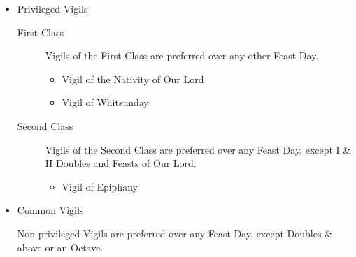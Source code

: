 \begin{itemize}
    \item Privileged Vigils\par
        \begin{description}
            \item[First Class] Vigils of the First Class are preferred over any other Feast Day.
                \begin{itemize}
                    \item Vigil of the Nativity of Our Lord
                    \item Vigil of Whitsunday
                \end{itemize}
            \item[Second Class] Vigils of the Second Class are preferred over any Feast Day, except I \& II Doubles and Feasts of Our Lord.
                \begin{itemize}
                    \item Vigil of Epiphany
                \end{itemize}
        \end{description}
    \item Common Vigils\par
        Non-privileged Vigils are preferred over any Feast Day, except Doubles \& above or an Octave.
\end{itemize}

%
